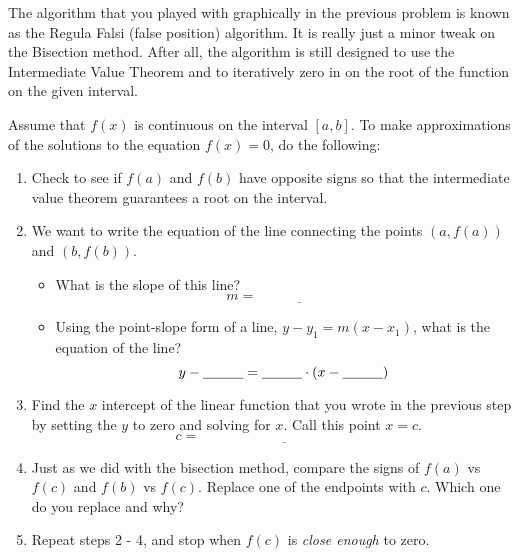 The algorithm that you played with graphically in the previous problem is known as the
Regula Falsi (false position) algorithm.  It is really just a minor tweak on the Bisection
method.  After all, the algorithm is still designed to use the Intermediate Value Theorem
and to iteratively zero in on the root of the function on the given interval.

\begin{algorithm}
    Assume that $f(x)$ is continuous on the interval $[a,b]$. To make approximations of
    the solutions to the equation $f(x) = 0$, do the following:
    \begin{enumerate}
        \item Check to see if $f(a)$ and $f(b)$ have opposite signs so that the
            intermediate value theorem guarantees a root on the interval.
        \item We want to write the equation of the line connecting the points $(a,f(a))$ and
            $(b,f(b))$.
            \begin{itemize}
                \item What is the slope of this line?
                    \[ m = \underline{\hspace{1in}} \]
                \item Using the point-slope form of a line, $y-y_1 = m(x-x_1)$, what is
                    the equation of the line?
                    \[ y - \underline{\hspace{0.4in}} = \underline{\hspace{0.4in}} \cdot
                    \left( x - \underline{\hspace{0.4in}} \right) \]
            \end{itemize}
            \solution{
                \[ y - f(a) = \left( \frac{f(b) - f(a)}{b-a} \right) \left( x-a
                    \right) \]
            }
        \item Find the $x$ intercept of the linear function that you wrote in the previous
            step by setting the $y$ to zero and solving for $x$.  Call this point $x=c$.
            \[ c = \underline{\hspace{2in}} \]
            \solution{
                \[ 0 - f(a) = \left( \frac{f(b) - f(a)}{b-a} \right) \left( x-a
                    \right) \implies x = a+ \left( \frac{-f(a) (b-a)}{f(b)-f(a)} \right) \]
            }
        \item Just as we did with the bisection method, compare the signs of $f(a)$ vs
            $f(c)$ and $f(b)$ vs $f(c)$.  Replace one of the endpoints with $c$. Which one
            do you replace and why?
        \item Repeat steps 2 - 4, and stop when $f(c)$ is {\it close enough} to zero.
    \end{enumerate}
\end{algorithm}


